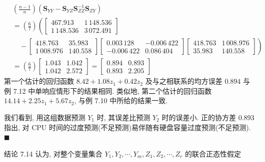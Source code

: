 \[
\begin{aligned}
&\left(\frac{n-1}{n}\right)\left(\mathbf{S}_{YY}-\mathbf{S}_{YZ}\mathbf{S}_{ZZ}^{-1}\mathbf{S}_{ZY}\right)\\
&=\left(\frac{6}{7}\right)\left(\left[\begin{array}{cc}467.913&1\,148.536\\1\,148.536&3\,072.491\end{array}\right]\right.\\
&\quad-\left[\begin{array}{cc}418.763&35.983\\1\,008.976&140.558\end{array}\right]\left[\begin{array}{cc}0.003\,128&-0.006\,422\\-0.006\,422&0.086\,404\end{array}\right]\left.\left[\begin{array}{cc}418.763&1\,008.976\\35.983&140.558\end{array}\right]\right)\\
&=\left(\frac{6}{7}\right)\left[\begin{array}{cc}1.043&1.042\\1.042&2.572\end{array}\right]=\left[\begin{array}{cc}0.894&0.893\\0.893&2.205\end{array}\right]
\end{aligned}
\]
第一个估计的回归函数 $8.42+1.08z_1+0.42z_2$ 及与之相联系的均方误差 $0.894$ 与例 7.12 中单响应情形下的结果相同. 类似地, 第二个估计的回归函数 $14.14+2.25z_1+5.67z_2$, 与例 7.10 中所给的结果一致.

我们看到, 用这组数据预测 $Y_1$ 时, 其误差比预测 $Y_2$ 时的误差小. 正的协方差 $0.893$ 指出, 对 CPU 时间的过度预测(不足预测)易伴随有硬盘容量过度预测(不足预测). \hfill$\blacksquare$

\quad 结论 7.14 认为, 对整个变量集合 $Y_1,Y_2,\cdots,Y_m,Z_1,Z_2,\cdots,Z_r$ 的联合正态性假定

